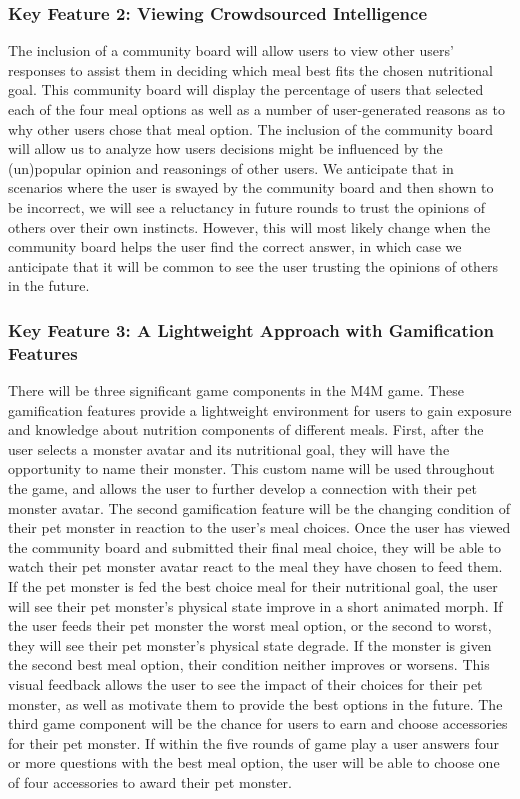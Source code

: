 \subsubsection*{Key Feature 2: Viewing Crowdsourced Intelligence}
The inclusion of a community board will allow users to view other users' responses to assist them in deciding which meal best fits the chosen nutritional goal. 
This community board will display the percentage of users that selected each of the four meal options as well as a number of user-generated reasons as to why other users chose that meal option. 
The inclusion of the community board will allow us to analyze how users decisions might be influenced by the (un)popular opinion and reasonings of other users. 
We anticipate that in scenarios where the user is swayed by the community board and then shown to be incorrect, we will see a reluctancy in future rounds to trust the opinions of others over their own instincts. 
However, this will most likely change when the community board helps the user find the correct answer, in which case we anticipate that it will be common to see the user trusting the opinions of others in the future.
  
\subsubsection*{Key Feature 3: A Lightweight Approach with Gamification Features}
There will be three significant game components in the M4M game. 
These gamification features provide a lightweight environment for users to gain exposure and knowledge about nutrition components of different meals.
First, after the user selects a monster avatar and its nutritional goal, they will have the opportunity to name their monster. 
This custom name will be used throughout the game, and allows the user to further develop a connection with their pet monster avatar. 
The second gamification feature will be the changing condition of their pet monster in reaction to the user's meal choices. 
Once the user has viewed the community board and submitted their final meal choice, they will be able to watch their pet monster avatar react to the meal they have chosen to feed them. 
If the pet monster is fed the best choice meal for their nutritional goal, the user will see their pet monster's physical state improve in a short animated morph.
If the user feeds their pet monster the worst meal option, or the second to worst, they will see their pet monster's physical state degrade. 
If the monster is given the second best meal option, their condition neither improves or worsens. 
This visual feedback allows the user to see the impact of their choices for their pet monster, as well as motivate them to provide the best options in the future.
The third game component will be the chance for users to earn and choose accessories for their pet monster. 
If within the five rounds of game play a user answers four or more questions with the best meal option, the user will be able to choose one of four accessories to award their pet monster.

